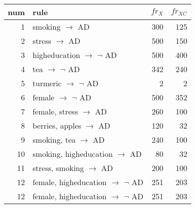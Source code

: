 \documentclass{article} %
\begin{document}
\begin{tabular}{|r|l|r|r|}
    \hline
    num & rule                                          & $\mathit{fr_X}$ & $\mathit{fr_{XC}}$ \\
    \hline
    1   & smoking $\rightarrow$ AD                      & 300             & 125                \\
    2   & stress $\rightarrow$ AD                       & 500             & 150                \\
    3   & higheducation $\rightarrow$ $\neg$ AD         & 500             & 400                \\
    4   & tea $\rightarrow$ $\neg$ AD                   & 342             & 240                \\
    5   & turmeric $\rightarrow$ $\neg$ AD              & 2               & 2                  \\
    6   & female $\rightarrow$ $\neg$ AD                & 500             & 352                \\
    7   & female, stress $\rightarrow$ AD               & 260             & 100                \\
    8   & berries, apples $\rightarrow$ AD              & 120             & 32                 \\
    9   & smoking, tea $\rightarrow$ AD                 & 240             & 100                \\
    10  & smoking, higheducation $\rightarrow$ AD       & 80              & 32                 \\
    11  & stress, smoking $\rightarrow$ AD              & 200             & 100                \\
    12  & female, higheducation $\rightarrow$ $\neg$ AD & 251             & 203                \\
    12  & female, higheducation $\rightarrow$ $\neg$ AD & 251             & 203                \\
    \hline
\end{tabular}
\end{document}
